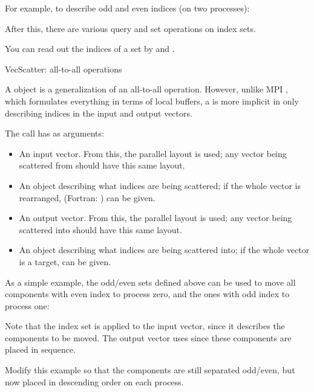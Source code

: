 For example, to describe odd and even indices (on two processes):
%

After this, there are various query and set operations on index sets.

You can read out the indices of a set by 
and .

 {VecScatter: all-to-all operations}
\label{sec:petsc-vs}

A  object is a generalization of an
all-to-all operation. However, unlike MPI ,
which formulates everything in terms of local buffers, a
 is more implicit in only describing indices in
the input and output vectors.

The  call has as arguments:
\begin{itemize}
\item An input vector. From this, the parallel layout is used; any
  vector being scattered from should have this same layout.
\item An  object describing what indices are being
  scattered; if the whole vector is rearranged, 
  (Fortran: ) can be given.
\item An output vector. From this, the parallel layout is used; any
  vector being scattered into should have this same layout.
\item An  object describing what indices are being
  scattered into; if the whole vector is a target,  can
  be given.
\end{itemize}

As a simple example, the odd/even sets defined above can be used to
move all components with even index to process zero, and the ones with
odd index to process one:
%

Note that the index set is applied to the input vector, since it
describes the components to be moved. The output vector uses
 since these components are placed in sequence.

\begin{exercise}
  Modify this example so that the components are still separated
  odd/even, but now placed in descending order on each process.
\end{exercise}

